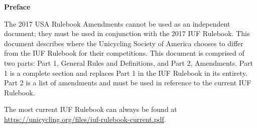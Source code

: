 {\huge \textbf{Preface} \\}
\thispagestyle{plain}


The 2017 USA Rulebook Amendments cannot be used as an independent document; they must be used in conjunction with the 2017 IUF Rulebook.
This document describes where the Unicycling Society of America chooses to differ from the IUF Rulebook for their competitions.
This document is comprised of two parts: Part 1, General Rules and Definitions, and Part 2, Amendments.
Part 1 is a complete section and replaces Part 1 in the IUF Rulebook in its entirety.
Part 2 is a list of amendments and must be used in reference to the current IUF Rulebook.

The most current IUF Rulebook can always be found at \url{https://unicycling.org/files/iuf-rulebook-current.pdf}.
